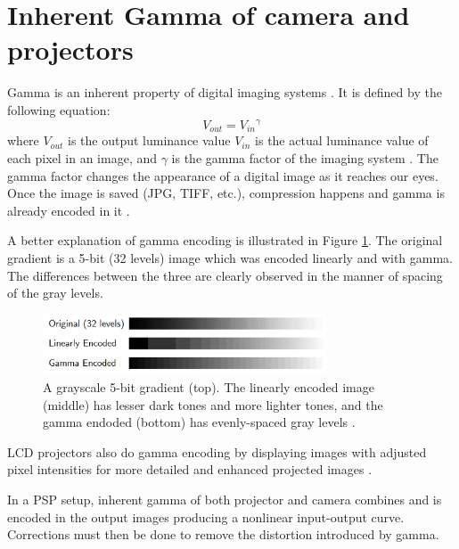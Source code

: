 \section{Inherent Gamma of camera and projectors}

Gamma is an inherent property of digital imaging systems \cite{Wang2014}. It is defined by the following equation:
\begin{equation}
V_{out} = {V_{in}}^\gamma
\end{equation}
where $V_{out}$ is the output luminance value $V_{in}$ is the actual luminance value of each pixel in an image, and $\gamma$ is the gamma factor of the imaging system \cite{McHugh2014}. The gamma factor changes the appearance of a digital image as it reaches our eyes. Once the image is saved (JPG, TIFF, etc.), compression happens and gamma is already encoded in it \cite{Wang2014}.

A better explanation of gamma encoding is illustrated in Figure \ref{fig:gammafactor}. The original gradient is a 5-bit (32 levels) image which was encoded linearly and with gamma. The differences between the three are clearly observed in the manner of spacing of the gray levels. 

\captionsetup[figure]{width=5in}
\begin{figure}[h!]
	\centering
	\includegraphics[width=0.75\textwidth]{figures/gammafactor.jpg}
	\caption[Grayscale 5-bit gradients]{A grayscale 5-bit gradient (top). The linearly encoded image (middle) has lesser dark tones and more lighter tones, and the gamma endoded (bottom) has evenly-spaced gray levels \cite{McHugh2014}.}
	\label{fig:gammafactor}
\end{figure}

LCD projectors also do gamma encoding by displaying images with adjusted pixel intensities for more detailed and enhanced projected images \cite{Li2011}. 

In a PSP setup, inherent gamma of both projector and camera combines and is encoded in the output images producing a nonlinear input-output curve. Corrections must then be done to remove the distortion introduced by gamma.
